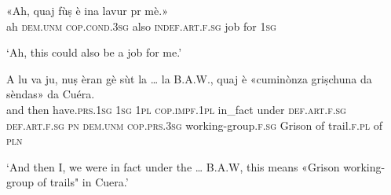\begin{linenumbers}
\gll «Ah, quaj fùṣ è ina lavur pr mè.»   \\
ah \textsc{dem.unm} \textsc{cop.cond.3sg} also \textsc{indef.art.f.sg} job for \textsc{1sg} \\
\end{linenumbers}
\medskip
\glt `Ah, this could also be a job for me.'
\medskip

\begin{linenumbers}
\gll A lu va ju, nuṣ èran gè sùt la … la B.A.W.\footnotemark, quaj è «cuminònza griṣchuna da sèndas» da Cuéra.    \\
and then have.\textsc{prs.1sg} \textsc{1sg} \textsc{1pl} \textsc{cop.impf.1pl} in\_fact under \textsc{def.art.f.sg} {} \textsc{def.art.f.sg}  \textsc{pn}  \textsc{dem.unm} \textsc{cop.prs.3sg} working-group.\textsc{f.sg} Grison of  trail.\textsc{f.pl} of \textsc{pln} \\
\end{linenumbers}
\medskip
\glt `And then I, we were in fact under the … B.A.W, this means «Grison working-group of trails" in Cuera.'
\medskip

